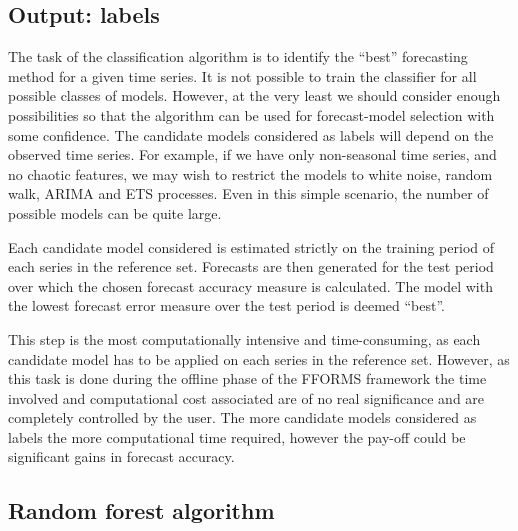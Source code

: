 \documentclass[11pt,a4paper,]{article}
\theoremstyle{definition}
\theoremstyle{definition}
\theoremstyle{definition}
\theoremstyle{remark}
\begin{document}
\hypertarget{output-labels}{%
\subsection{Output: labels}\label{output-labels}}

The task of the classification algorithm is to identify the ``best''
forecasting method for a given time series. It is not possible to train
the classifier for all possible classes of models. However, at the very
least we should consider enough possibilities so that the algorithm can
be used for forecast-model selection with some confidence. The candidate
models considered as labels will depend on the observed time series. For
example, if we have only non-seasonal time series, and no chaotic
features, we may wish to restrict the models to white noise, random
walk, ARIMA and ETS processes. Even in this simple scenario, the number
of possible models can be quite large.

Each candidate model considered is estimated strictly on the training
period of each series in the reference set. Forecasts are then generated
for the test period over which the chosen forecast accuracy measure is
calculated. The model with the lowest forecast error measure over the
test period is deemed ``best''.

This step is the most computationally intensive and time-consuming, as
each candidate model has to be applied on each series in the reference
set. However, as this task is done during the offline phase of the
FFORMS framework the time involved and computational cost associated are
of no real significance and are completely controlled by the user. The
more candidate models considered as labels the more computational time
required, however the pay-off could be significant gains in forecast
accuracy.

\hypertarget{random-forest-algorithm}{%
\subsection{Random forest algorithm}\label{random-forest-algorithm}}
\end{document}

